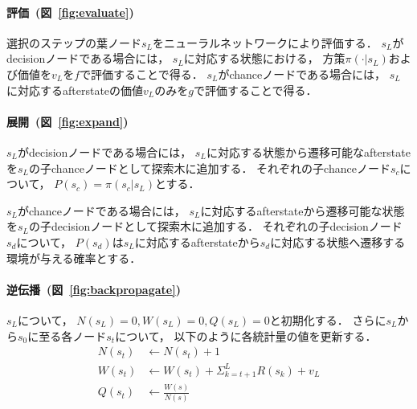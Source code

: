 \paragraph{評価~(図~\ref{fig:evaluate})}
選択のステップの葉ノード$s_L$をニューラルネットワークにより評価する．
$s_L$がdecisionノードである場合には， $s_L$に対応する状態における， 方策$\pi(\cdot|s_L)$および価値を$v_L$を$f$で評価することで得る．
$s_L$がchanceノードである場合には， $s_L$に対応するafterstateの価値$v_L$のみを$g$で評価することで得る．

\paragraph{展開~(図~\ref{fig:expand})}
$s_L$がdecisionノードである場合には， $s_L$に対応する状態から遷移可能なafterstateを$s_L$の子chanceノードとして探索木に追加する．
それぞれの子chanceノード$s_c$について， $P(s_c) = \pi(s_c|s_L)$とする．

$s_L$がchanceノードである場合には， $s_L$に対応するafterstateから遷移可能な状態を$s_L$の子decisionノードとして探索木に追加する．
それぞれの子decisionノード$s_d$について， $P(s_d)$は$s_L$に対応するafterstateから$s_d$に対応する状態へ遷移する環境が与える確率とする．

\paragraph{逆伝播~(図~\ref{fig:backpropagate})}
$s_L$について， $N(s_L)=0, W(s_L)=0, Q(s_L)=0$と初期化する．
さらに$s_L$から$s_0$に至る各ノード$s_t$について， 以下のように各統計量の値を更新する．
\begin{align*}
  N(s_t) &\leftarrow N(s_t) + 1 \\
  W(s_t) &\leftarrow W(s_t) + \Sigma_{k=t+1}^{L} R(s_k) + v_L \\
  Q(s_t) &\leftarrow \frac{W(s)}{N(s)}
\end{align*}

